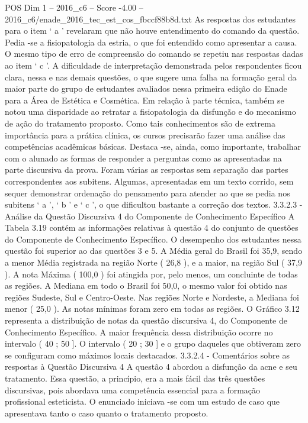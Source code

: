 \begin{textsample}{POS Dim 1 – 2016\_c6 – Score -4.00 – 2016\_c6/enade\_2016\_tec\_est\_cos\_fbccf88b8d.txt}
As respostas dos estudantes para o item ‘ a ’ revelaram que não houve entendimento do comando da questão.
Pedia -se a fisiopatologia da estria, o que foi entendido como apresentar a causa.
O mesmo tipo de erro de compreensão do comando se repetiu nas respostas dadas ao item ‘ c ’.
A dificuldade de interpretação demonstrada pelos respondentes ficou clara, nessa e nas demais questões, o que sugere uma falha na formação geral da maior parte do grupo de estudantes avaliados nessa primeira edição do Enade para a Área de Estética e Cosmética.
Em relação à parte técnica, também se notou uma disparidade ao retratar a fisiopatologia da disfunção e do mecanismo de ação do tratamento proposto.
Como tais conhecimentos são de extrema importância para a prática clínica, os cursos precisarão fazer uma análise das competências acadêmicas básicas.
Destaca -se, ainda, como importante, trabalhar com o alunado as formas de responder a perguntas como as apresentadas na parte discursiva da prova.
Foram várias as respostas sem separação das partes correspondentes aos subitens.
Algumas, apresentadas em um texto corrido, sem sequer demonstrar ordenação do pensamento para atender ao que se pedia nos subitens ‘ a ’, ‘ b ’ e ‘ c ’, o que dificultou bastante a correção dos textos. 3.3.2.3 - Análise da Questão Discursiva 4 do Componente de Conhecimento Específico A Tabela 3.19 contém as informações relativas à questão 4 do conjunto de questões do Componente de Conhecimento Específico.
O desempenho dos estudantes nessa questão foi superior ao das questões 3 e 5.
A Média geral do Brasil foi 35,9, sendo a menor Média registrada na região Norte ( 26,8 ), e a maior, na região Sul ( 37,9 ).
A nota Máxima ( 100,0 ) foi atingida por, pelo menos, um concluinte de todas as regiões.
A Mediana em todo o Brasil foi 50,0, o mesmo valor foi obtido nas regiões Sudeste, Sul e Centro-Oeste.
Nas regiões Norte e Nordeste, a Mediana foi menor ( 25,0 ).
As notas mínimas foram zero em todas as regiões.
O Gráfico 3.12 representa a distribuição de notas da questão discursiva 4, do Componente de Conhecimento Específico.
A maior frequência dessa distribuição ocorre no intervalo ( 40 ; 50 ].
O intervalo ( 20 ; 30 ] e o grupo daqueles que obtiveram zero se configuram como máximos locais destacados. 3.3.2.4 - Comentários sobre as respostas à Questão Discursiva 4 A questão 4 abordou a disfunção da acne e seu tratamento.
Essa questão, a princípio, era a mais fácil das três questões discursivas, pois abordava uma competência essencial para a formação profissional esteticista.
O enunciado iniciava -se com um estudo de caso que apresentava tanto o caso quanto o tratamento proposto.

\end{textsample}
